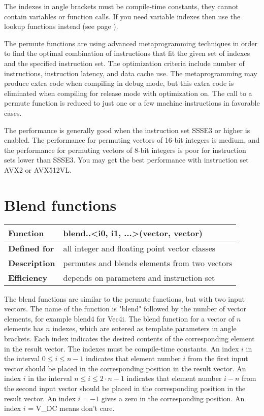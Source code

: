 \documentclass[vcl_manual.tex]{subfiles}
\begin{document}
The indexes in angle brackets must be compile-time constants, they cannot contain variables or function calls. If you need variable indexes then use the lookup functions instead (see page \pageref{LookupFunctions}).

The permute functions are using advanced metaprogramming techniques in order to find the optimal combination of instructions that fit the given set of indexes and the specified instruction set. The optimization criteria include number of instructions, instruction latency, and data cache use. The metaprogramming may produce extra code when compiling in debug mode, but this extra code is eliminated when compiling for release mode with optimization on. The call to a permute function is reduced to just one or a few machine instructions in favorable cases. 

The performance is generally good when the instruction set SSSE3 or higher is enabled. The performance for permuting vectors of 16-bit integers is medium, and the performance for permuting vectors of 8-bit integers is poor for instruction sets lower than SSSE3. You may get the best performance with instruction set AVX2 or AVX512VL.


\section{Blend functions}\label{BlendFunctions}

\begin{tabular}{|p{30mm}|p{120mm}|}
\hline
\bfseries Function & blend..\textless i0, i1, ...\textgreater(vector, vector) \\ \hline
\bfseries Defined for & all integer and floating point vector classes \\ \hline
\bfseries Description & permutes and blends elements from two vectors \\ \hline
\bfseries Efficiency & depends on parameters and instruction set \\ \hline
\end{tabular}

The blend functions are similar to the permute functions, but with two input vectors. 
The name of the function is "blend" followed by the number of vector elements, for example blend4 for Vec4i. The blend function for a vector of $n$ elements has $n$ indexes, which are entered as template parameters in angle brackets. Each index indicates the desired contents of the corresponding element in the result vector. The indexes must be compile-time constants.
An index $i$ in the interval $0 \leq i \leq n-1$ indicates that element number $i$ from the first input vector should be placed in the corresponding position in the result vector. An index $i$ in the interval $n \leq i \leq 2 \cdot n-1$ indicates that element number $i-n$ from the second input vector should be placed in the corresponding position in the result vector. An index $i = -1$ gives a zero in the corresponding position. An index $i$ = V\_DC means don't care.
\end{document}
